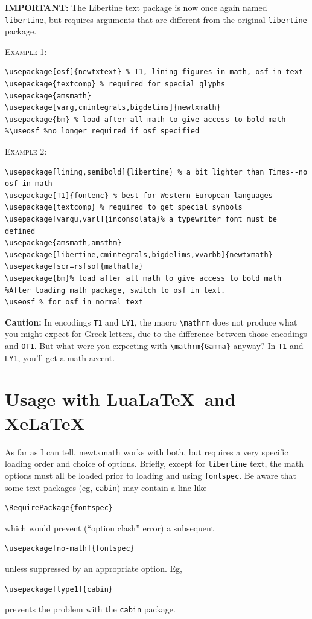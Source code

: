 \documentclass[11pt]{article}
\begin{document}
\textbf{IMPORTANT:} The Libertine text package is now once again named {\tt libertine}, but requires arguments that are different from the original {\tt libertine} package.

\textsc{Example 1:}
\begin{verbatim}
\usepackage[osf]{newtxtext} % T1, lining figures in math, osf in text
\usepackage{textcomp} % required for special glyphs
\usepackage{amsmath}
\usepackage[varg,cmintegrals,bigdelims]{newtxmath}
\usepackage{bm} % load after all math to give access to bold math
%\useosf %no longer required if osf specified
\end{verbatim}
\textsc{Example 2:}
\begin{verbatim}
\usepackage[lining,semibold]{libertine} % a bit lighter than Times--no osf in math
\usepackage[T1]{fontenc} % best for Western European languages
\usepackage{textcomp} % required to get special symbols
\usepackage[varqu,varl]{inconsolata}% a typewriter font must be defined
\usepackage{amsmath,amsthm}
\usepackage[libertine,cmintegrals,bigdelims,vvarbb]{newtxmath}
\usepackage[scr=rsfso]{mathalfa}
\usepackage{bm}% load after all math to give access to bold math
%After loading math package, switch to osf in text.
\useosf % for osf in normal text
\end{verbatim}

\textbf{Caution:} In encodings {\tt T1} and {\tt LY1}, the macro \verb|\mathrm| does not produce what you might expect for Greek letters, due to the difference between those encodings and {\tt OT1}. But what were you expecting with \verb|\mathrm{Gamma}| anyway? In {\tt T1} and {\tt LY1}, you'll get a math accent.

\section{Usage with Lua\LaTeX\ and Xe\LaTeX}
As far as I can tell, \textsf{newtxmath} works with both, but requires a very specific loading order and choice of options. Briefly, except for {\tt libertine} text, the math options must all be loaded prior to loading and using {\tt fontspec}. Be aware that some text packages (eg, {\tt cabin}) may contain a line like
\begin{verbatim}
\RequirePackage{fontspec}
\end{verbatim}
which would prevent (``option clash'' error) a subsequent 
\begin{verbatim}
\usepackage[no-math]{fontspec}
\end{verbatim}
unless suppressed by an appropriate option. Eg, 
\begin{verbatim}
\usepackage[type1]{cabin}
\end{verbatim}
prevents the problem with the {\tt cabin} package.
\end{document}
